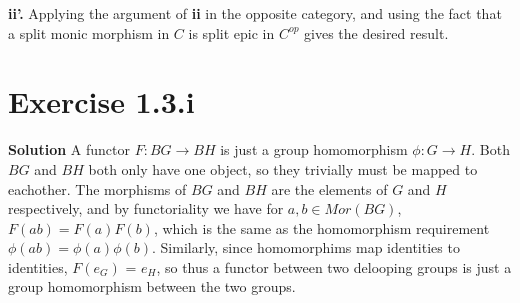 \documentclass{article}
\begin{document}
\textbf{ii'. } Applying the argument of \textbf{ii} in the opposite category, and using the fact that a split monic morphism in $C$ is split epic in $C^{op}$ gives the desired result.


\section{Exercise 1.3.i}

\textbf{Solution }A functor $F : BG \to BH$ is just a group homomorphism $\phi : G \to H$. Both $BG$ and $BH$ both only have one object, so they trivially must be mapped to eachother. The morphisms of $BG$ and $BH$ are the 
elements of $G$ and $H$ respectively, and by functoriality we have for $a, b \in Mor(BG)$, $F(ab) = F(a)F(b)$, which is the same as the homomorphism requirement $\phi(ab) = \phi(a)\phi(b)$. Similarly, since 
homomorphims map identities to identities, $F(e_G)$ = $e_H$, so thus a functor between two delooping groups is just a group homomorphism between the two groups. 
\end{document}
